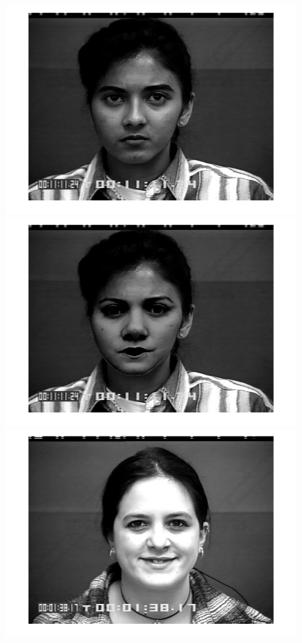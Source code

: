 \begin{figure}[!htb]
    	\includegraphics[scale=.10]{figure/79/02.png}
    	\includegraphics[scale=.10]{figure/79de/02.png}
    	\hspace{1cm}
    	\includegraphics[scale=.10]{figure/72/09.png}

\end{figure}
